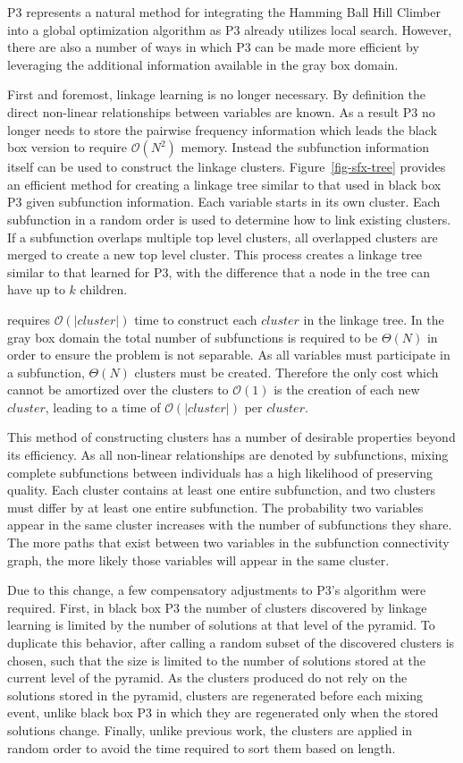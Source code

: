 \documentclass{sig-alternate}
\newcommand{\BigO}[1]{$\mathcal{O}{(#1)}$}
\begin{document}
P3 represents a natural method for integrating the Hamming Ball Hill Climber into
a global optimization algorithm as P3 already utilizes local search. However, there
are also a number of ways in which P3 can be made more efficient by leveraging the
additional information available in the gray box domain.

First and foremost, linkage learning is no longer necessary. By definition
the direct non-linear relationships between variables are known. As a result
P3 no longer needs to store the pairwise frequency information which leads
the black box version to require \BigO{N^2} memory. Instead the subfunction
information itself can be used to construct the linkage clusters.
Figure~\ref{fig-sfx-tree} provides an efficient method for creating a linkage
tree similar to that used in black box P3 given subfunction information.
Each variable starts in its own cluster. Each subfunction in a random order
is used to determine how to link existing clusters. If a subfunction overlaps
multiple top level clusters, all overlapped clusters are merged to create a new
top level cluster. This process creates a linkage tree similar to that learned
for P3, with the difference that a node in the tree can have up to $k$ children.

 requires \BigO{|cluster|} time to construct each $cluster$
in the linkage tree. In the gray box domain the total number of subfunctions is required
to be $\Theta(N)$ in order to ensure the problem is not separable. As all variables must
participate in a subfunction, $\Theta(N)$ clusters must be created. Therefore
the only cost which cannot be amortized over the clusters to \BigO{1} is the creation
of each new $cluster$, leading to a time of \BigO{|cluster|} per $cluster$.

This method of constructing clusters has a number of desirable properties beyond its
efficiency. As all non-linear relationships are denoted by subfunctions, mixing
complete subfunctions between individuals has a high likelihood of preserving quality.
Each cluster contains at least one entire subfunction, and two
clusters must differ by at least one entire subfunction. The probability two
variables appear in the same cluster increases with the number of subfunctions
they share. The more paths that exist between two variables in the subfunction
connectivity graph, the more likely those variables will appear in the same cluster.

Due to this change, a few compensatory adjustments to P3's algorithm were required.
First, in black box P3 the number of clusters discovered by linkage learning is
limited by the number of solutions at that level of the pyramid. To duplicate this
behavior, after calling  a random subset of the discovered
clusters is chosen, such that the size is limited to the number of solutions
stored at the current level of the pyramid. As the clusters produced do not
rely on the solutions stored in the pyramid, clusters are regenerated before each
mixing event, unlike black box P3 in which they are regenerated only when the stored
solutions change. Finally, unlike previous work, the clusters are applied in random order
to avoid the time required to sort them based on length.
\end{document}

